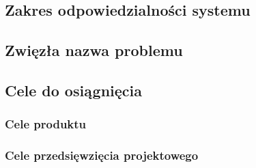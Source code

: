 \documentclass[paper=a4, fontsize=11pt]{scrartcl}
\numberwithin{equation}{section}		%
\numberwithin{figure}{section}			%
\numberwithin{table}{section}				%
\begin{document}
	\subsection{Zakres odpowiedzialności systemu}
		

	\subsection{Zwięzła nazwa problemu}
		

	\subsection{Cele do osiągnięcia}

		\subsubsection{Cele produktu}
			

		\subsubsection{Cele przedsięwzięcia projektowego}
			





\end{document}
